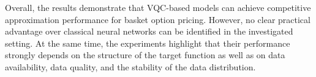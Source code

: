 Overall, the results demonstrate that VQC-based models can achieve
competitive approximation performance for basket option pricing.
However, no clear practical advantage over classical neural
networks can be identified in the investigated setting.
At the same time, the experiments highlight that their performance
strongly depends on the structure of the target function as well
as on data availability, data quality, and the stability of the
data distribution.